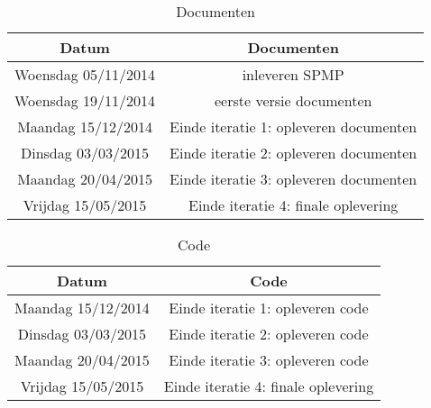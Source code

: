 \begin{comment}
WiseLib biedt de gebruiker de volgende mogelijkheden aan:


\begin{itemize}
\item Publicaties uploaden en downloaden
\item Beheren van eigen publicaties
\item Andere publicaties consulteren
\item Mogelijkheid om de site mobiel te gebruiken
\end{itemize}

Om die op tijd te kunnen verwezenlijken, zullen de deadlines van de kalender in tabel \ref{tab:kalender} gevolgd worden. 
\end{comment}

\begin{table}[h]

\begin{tabular}{c|c}
\hline
\textbf{Datum} & \textbf{Documenten}\\
 \hline
 Woensdag 05/11/2014 & inleveren SPMP \\
 Woensdag 19/11/2014 & eerste versie documenten \\
 Maandag 15/12/2014 & Einde iteratie 1: opleveren documenten \\
 \hline \hline
 Dinsdag 03/03/2015 & Einde iteratie 2: opleveren documenten \\
 Maandag 20/04/2015 & Einde iteratie 3: opleveren documenten \\
 Vrijdag 15/05/2015 & Einde iteratie 4: finale oplevering
\end{tabular}
\caption{Documenten}
\label{tab:doc}
\end{table}

\begin{table}[h]

\begin{tabular}{c|c}
\hline
\textbf{Datum} & \textbf{Code}\\
 \hline
 Maandag 15/12/2014 & Einde iteratie 1: opleveren code \\
 \hline \hline
 Dinsdag 03/03/2015 & Einde iteratie 2: opleveren code \\
 Maandag 20/04/2015 & Einde iteratie 3: opleveren code \\
 Vrijdag 15/05/2015 & Einde iteratie 4: finale oplevering
\end{tabular}
\caption{Code}
\label{tab:code}
\end{table}


